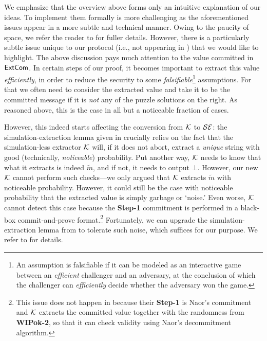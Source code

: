  We emphasize that the overview above forms only an intuitive explanation of our ideas. To implement them formally is more challenging as the aforementioned issues appear in a more subtle and technical manner. Owing to the paucity of space, we refer the reader to  for fuller details. However, there is a particularly subtle issue unique to our protocol (i.e., not appearing in \cite{FOCS:LPY23}) that we would like to highlight. The above discussion pays much attention to the value committed in $\mathsf{ExtCom}$. In certain steps of our proof, it becomes important to extract this value {\em efficiently}, in order to reduce the security to some {\em falsifiable}\footnote{An assumption is falsifiable \cite{C:Naor03,STOC:GenWic11} if it can be modeled as an interactive game between an {\em efficient} challenger and an adversary, at the conclusion of which the challenger can {\em efficiently} decide whether the adversary won the game.} assumptions. For that we often need to consider the extracted value and take it to be the committed message if it is {\em not} any of the puzzle solutions on the right. As reasoned above, this is the case in all but a noticeable fraction of cases.

However, this indeed starts affecting the conversion from $\mathcal{K}$ to $\mathcal{SE}$: the simulation-extraction lemma given in \cite{FOCS:LPY23} crucially relies on the fact that the simulation-less extractor $\mathcal{K}$ will, if it does not abort, extract a {\em unique} string with good (technically, {\em noticeable}) probability. Put another way, $\mathcal{K}$ needs to know that what it extracts is indeed $\tilde{m}$, and if not, it needs to output $\bot$. However, our new $\mathcal{K}$ cannot perform such checks---we only argued that $\mathcal{K}$ extracts $\tilde{m}$ with noticeable probability. However, it could still be the case with noticeable probability that the extracted value is simply garbage or `noise.' Even worse, $\mathcal{K}$ cannot detect this case because the {\bf Step-1} commitment is performed in a black-box commit-and-prove format.\footnote{This issue does not happen in \cite{FOCS:LPY23} because their {\bf Step-1} is Naor's commitment and $\mathcal{K}$ extracts the committed value together with the randomness from {\bf WIPok-2}, so that it can check validity using Naor's decommitment algorithm.} Fortunately, we can upgrade the simulation-extraction lemma from \cite{FOCS:LPY23} to tolerate such noise, which suffices for our purpose. We refer to  for details.

